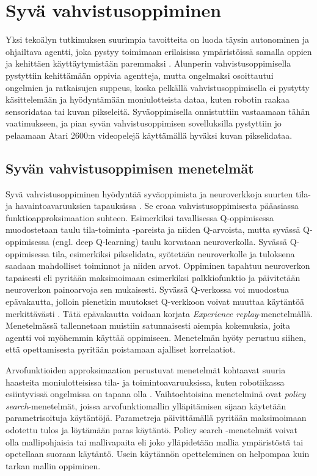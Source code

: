 \documentclass[utf8]{gradu3}
\begin{document}
\section{Syvä vahvistusoppiminen}

Yksi tekoälyn tutkimuksen suurimpia tavoitteita on luoda täysin autonominen ja ohjailtava agentti, joka pystyy toimimaan erilaisissa ympäristöissä samalla oppien ja kehittäen käyttäytymistään paremmaksi \parencite{arulkumaran2017brief}. Alunperin vahvistusoppimisella pystyttiin kehittämään oppivia agentteja, mutta ongelmaksi osoittautui ongelmien ja ratkaisujen suppeus, koska pelkällä vahvistusoppimisella ei pystytty käsittelemään ja hyödyntämään moniulotteista dataa, kuten robotin raakaa sensoridataa tai kuvan pikseleitä. Syväoppimisella onnistuttiin vastaamaan tähän vaatimukseen, ja pian syvän vahvistusoppimisen sovelluksilla pystyttiin jo pelaamaan Atari 2600:n videopelejä käyttämällä hyväksi kuvan pikselidataa.

\subsection{Syvän vahvistusoppimisen menetelmät}

Syvä vahvistusoppiminen hyödyntää syväoppimista ja neuroverkkoja suurten tila- ja havaintoavaruuksien tapauksissa \parencite{arulkumaran2017brief,li2018deep}. Se eroaa vahvistusoppimisesta pääasiassa funktioapproksimaation suhteen. Esimerkiksi tavallisessa Q-oppimisessa muodostetaan taulu tila-toiminta -pareista ja niiden Q-arvoista, mutta syvässä Q-oppimisessa (engl. deep Q-learning) taulu korvataan neuroverkolla. Syvässä Q-oppimisessa tila, esimerkiksi pikselidata, syötetään neuroverkolle ja tuloksena saadaan mahdolliset toiminnot ja niiden arvot. Oppiminen tapahtuu neuroverkon tapaisesti eli pyritään maksimoimaan esimerkiksi palkkiofunktio ja päivitetään neuroverkon painoarvoja sen mukaisesti. Syvässä Q-verkossa voi muodostua epävakautta, jolloin pienetkin muutokset Q-verkkoon voivat muuttaa käytäntöä merkittävästi \parencite{mnih2015human}. Tätä epävakautta voidaan korjata \textit{Experience replay}-menetelmällä. Menetelmässä tallennetaan muistiin satunnaisesti aiempia kokemuksia, joita agentti voi myöhemmin käyttää oppimiseen. Menetelmän hyöty perustuu siihen, että opettamisesta pyritään poistamaan ajalliset korrelaatiot.

Arvofunktioiden approksimaation perustuvat menetelmät kohtaavat suuria haasteita moniulotteisissa tila- ja toimintoavaruuksissa, kuten robotiikassa esiintyvissä ongelmissa on tapana olla \parencite{arulkumaran2017brief,deisenroth2013survey}. Vaihtoehtoisina menetelminä ovat \textit{policy search}-menetelmät, joissa arvofunktiomallin ylläpitämisen sijaan käytetään parametrisoituja käytäntöjä. Parametreja päivittämällä pyritään maksimoimaan odotettu tulos ja löytämään paras käytäntö. Policy search -menetelmät voivat olla mallipohjaisia tai mallivapaita eli joko ylläpidetään mallia ympäristöstä tai opetellaan suoraan käytäntö. Usein käytännön opetteleminen on helpompaa kuin tarkan mallin oppiminen.
\end{document}
